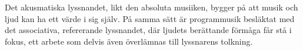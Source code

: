 \documentclass{article}
\begin{document}
Det akusmatiska lyssnandet, likt den absoluta musiiken, bygger på att musik och ljud kan ha ett värde i sig
själv. 
På samma sätt är programmusik besläktat med det associativa, refererande lyssnandet, där ljudets berättande
förmåga får stå i fokus, ett arbete som delvis även överlämnas till lyssnarens tolkning.











\end{document}
